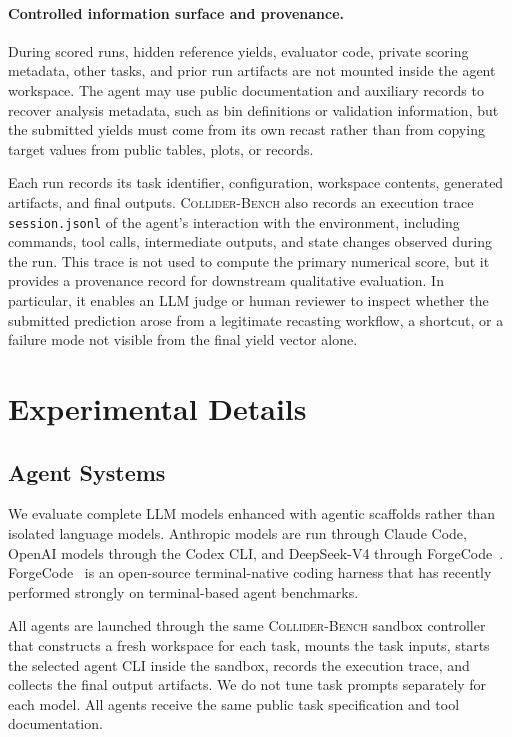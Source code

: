 \documentclass{article}
\newcommand{\ColliderBench}{\textsc{Collider-Bench}}
\begin{document}
\paragraph{Controlled information surface and provenance.}
During scored runs, hidden reference yields, evaluator code, private scoring metadata, other tasks, and prior run artifacts are not mounted inside the agent workspace. The agent may use public documentation and auxiliary records to recover analysis metadata, such as bin definitions or validation information, but the submitted yields must come from its own recast rather than from copying target values from public tables, plots, or records.

Each run records its task identifier, configuration, workspace contents, generated artifacts, and final outputs. \ColliderBench{} also records an execution trace {\tt session.jsonl} of the agent's interaction with the environment, including commands, tool calls, intermediate outputs, and state changes observed during the run. This trace is not used to compute the primary numerical score, but it provides a provenance record for downstream qualitative evaluation. In particular, it enables an LLM judge or human reviewer to inspect whether the submitted prediction arose from a legitimate recasting workflow, a shortcut, or a failure mode not visible from the final yield vector alone.

\section{Experimental Details}
\label{app:experimental-details}

\subsection{Agent Systems}
\label{app:agent-systems}

We evaluate complete LLM models enhanced with agentic scaffolds rather than isolated language models. Anthropic models are run through Claude Code, OpenAI models through the Codex CLI, and DeepSeek-V4 through ForgeCode~\citep{forgecode2026}. ForgeCode~\citep{forgecode2026} is an open-source terminal-native coding harness that has recently performed strongly on terminal-based agent benchmarks.

All agents are launched through the same \ColliderBench{} sandbox controller that constructs a fresh workspace for each task, mounts the task inputs, starts the selected agent CLI inside the sandbox, records the execution trace, and collects the final output artifacts. We do not tune task prompts separately for each model. All agents receive the same public task specification and tool documentation.
\end{document}
